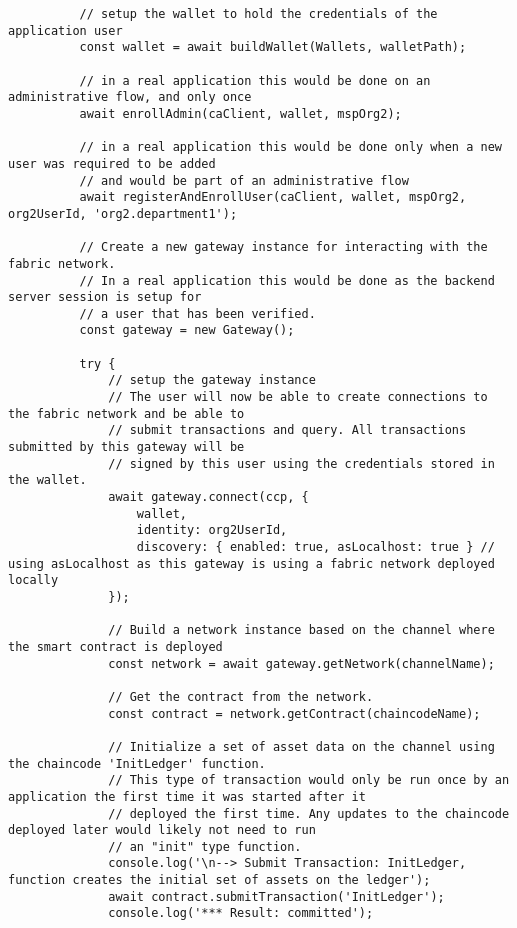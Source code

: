 \begin{lstlisting}
          // setup the wallet to hold the credentials of the application user
          const wallet = await buildWallet(Wallets, walletPath);
  
          // in a real application this would be done on an administrative flow, and only once
          await enrollAdmin(caClient, wallet, mspOrg2);
  
          // in a real application this would be done only when a new user was required to be added
          // and would be part of an administrative flow
          await registerAndEnrollUser(caClient, wallet, mspOrg2, org2UserId, 'org2.department1');
  
          // Create a new gateway instance for interacting with the fabric network.
          // In a real application this would be done as the backend server session is setup for
          // a user that has been verified.
          const gateway = new Gateway();
  
          try {
              // setup the gateway instance
              // The user will now be able to create connections to the fabric network and be able to
              // submit transactions and query. All transactions submitted by this gateway will be
              // signed by this user using the credentials stored in the wallet.
              await gateway.connect(ccp, {
                  wallet,
                  identity: org2UserId,
                  discovery: { enabled: true, asLocalhost: true } // using asLocalhost as this gateway is using a fabric network deployed locally
              });
  
              // Build a network instance based on the channel where the smart contract is deployed
              const network = await gateway.getNetwork(channelName);
  
              // Get the contract from the network.
              const contract = network.getContract(chaincodeName);
  
              // Initialize a set of asset data on the channel using the chaincode 'InitLedger' function.
              // This type of transaction would only be run once by an application the first time it was started after it
              // deployed the first time. Any updates to the chaincode deployed later would likely not need to run
              // an "init" type function.
              console.log('\n--> Submit Transaction: InitLedger, function creates the initial set of assets on the ledger');
              await contract.submitTransaction('InitLedger');
              console.log('*** Result: committed');
  

\end{lstlisting}
